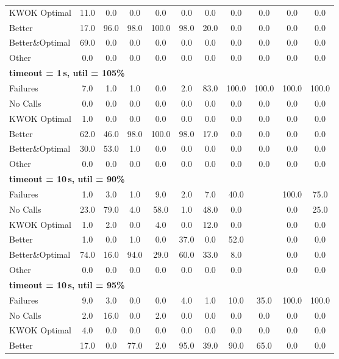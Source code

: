 \begin{tabular}{l cccccccccc}
KWOK Optimal & 11.0 & 0.0 & 0.0 & 0.0 & 0.0 & 0.0 & 0.0 & 0.0 & 0.0 & 0.0 \\
Better & 17.0 & 96.0 & 98.0 & 100.0 & 98.0 & 20.0 & 0.0 & 0.0 & 0.0 & 0.0 \\
Better\&Optimal & 69.0 & 0.0 & 0.0 & 0.0 & 0.0 & 0.0 & 0.0 & 0.0 & 0.0 & 0.0 \\
Other & 0.0 & 0.0 & 0.0 & 0.0 & 0.0 & 0.0 & 0.0 & 0.0 & 0.0 & 0.0 \\
\midrule
\multicolumn{11}{l}{\textbf{timeout = 1\,s, util = 105\%}} \\
\midrule
Failures & 7.0 & 1.0 & 1.0 & 0.0 & 2.0 & 83.0 & 100.0 & 100.0 & 100.0 & 100.0 \\
No Calls & 0.0 & 0.0 & 0.0 & 0.0 & 0.0 & 0.0 & 0.0 & 0.0 & 0.0 & 0.0 \\
KWOK Optimal & 1.0 & 0.0 & 0.0 & 0.0 & 0.0 & 0.0 & 0.0 & 0.0 & 0.0 & 0.0 \\
Better & 62.0 & 46.0 & 98.0 & 100.0 & 98.0 & 17.0 & 0.0 & 0.0 & 0.0 & 0.0 \\
Better\&Optimal & 30.0 & 53.0 & 1.0 & 0.0 & 0.0 & 0.0 & 0.0 & 0.0 & 0.0 & 0.0 \\
Other & 0.0 & 0.0 & 0.0 & 0.0 & 0.0 & 0.0 & 0.0 & 0.0 & 0.0 & 0.0 \\
\midrule
\multicolumn{11}{l}{\textbf{timeout = 10\,s, util = 90\%}} \\
\midrule
Failures & 1.0 & 3.0 & 1.0 & 9.0 & 2.0 & 7.0 & 40.0 & \text{--} & 100.0 & 75.0 \\
No Calls & 23.0 & 79.0 & 4.0 & 58.0 & 1.0 & 48.0 & 0.0 & \text{--} & 0.0 & 25.0 \\
KWOK Optimal & 1.0 & 2.0 & 0.0 & 4.0 & 0.0 & 12.0 & 0.0 & \text{--} & 0.0 & 0.0 \\
Better & 1.0 & 0.0 & 1.0 & 0.0 & 37.0 & 0.0 & 52.0 & \text{--} & 0.0 & 0.0 \\
Better\&Optimal & 74.0 & 16.0 & 94.0 & 29.0 & 60.0 & 33.0 & 8.0 & \text{--} & 0.0 & 0.0 \\
Other & 0.0 & 0.0 & 0.0 & 0.0 & 0.0 & 0.0 & 0.0 & \text{--} & 0.0 & 0.0 \\
\midrule
\multicolumn{11}{l}{\textbf{timeout = 10\,s, util = 95\%}} \\
\midrule
Failures & 9.0 & 3.0 & 0.0 & 0.0 & 4.0 & 1.0 & 10.0 & 35.0 & 100.0 & 100.0 \\
No Calls & 2.0 & 16.0 & 0.0 & 2.0 & 0.0 & 0.0 & 0.0 & 0.0 & 0.0 & 0.0 \\
KWOK Optimal & 4.0 & 0.0 & 0.0 & 0.0 & 0.0 & 0.0 & 0.0 & 0.0 & 0.0 & 0.0 \\
Better & 17.0 & 0.0 & 77.0 & 2.0 & 95.0 & 39.0 & 90.0 & 65.0 & 0.0 & 0.0 \\

\end{tabular}
